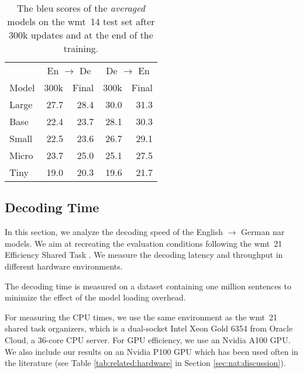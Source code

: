 \begin{table}
  \centering

  \begin{tabular}{lrrrr}
    \toprule
    & \multicolumn{2}{c}{En $\rightarrow$ De}
    & \multicolumn{2}{c}{De $\rightarrow$ En} \\
    Model
    & 300k & Final & 300k &  Final \\
    \midrule

    Large & 27.7 & 28.4 & 30.0 & 31.3 \\
    Base  & 22.4 & 23.7 & 28.1 & 30.3 \\
    Small & 22.5 & 23.6 & 26.7 & 29.1 \\
    Micro & 23.7 & 25.0 & 25.1 & 27.5 \\
    Tiny  & 19.0 & 20.3 & 19.6 & 21.7 \\

    \bottomrule
  \end{tabular}

  \caption{The \acs{bleu} scores of the \emph{averaged} models on the
    \acs{wmt}~14 test set after 300k updates and at the end of the training.}%
  \label{tab:wmt14-weight-avg}

\end{table}


\subsection{Decoding Time}%
\label{subsec:results:time}

In this section, we analyze the decoding speed of the English $\rightarrow$
German \ac{nar} models. We aim at recreating the evaluation conditions
following the \acs{wmt}~21 Efficiency Shared Task
\citep{heafield-etal-2021-findings}. We measure the decoding latency and
throughput in different hardware environments.

The decoding time is measured on a dataset containing one million sentences to
minimize the effect of the model loading overhead.

For measuring the CPU times, we use the same environment as the \acs{wmt}~21
shared task organizers, which is a dual-socket Intel Xeon Gold 6354 from Oracle
Cloud, a 36-core CPU server. For GPU efficiency, we use an Nvidia A100 GPU.  We
also include our results on an Nvidia P100 GPU which has been used often in the
literature (see Table \ref{tab:related:hardware} in Section
\ref{sec:nat:discussion}).


